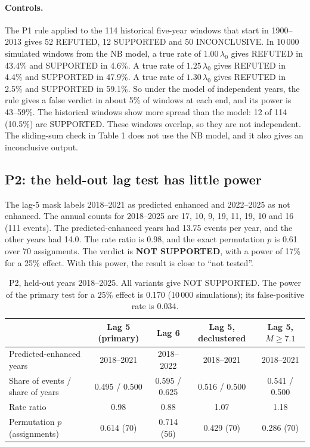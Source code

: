 \documentclass[11pt]{article}
\begin{document}
\paragraph{Controls.} The P1 rule applied to the 114 historical five-year windows that start in 1900--2013 gives 52 REFUTED, 12 SUPPORTED and 50 INCONCLUSIVE. In 10\,000 simulated windows from the NB model, a true rate of $1.00\,\lambda_0$ gives REFUTED in 43.4\% and SUPPORTED in 4.6\%. A true rate of $1.25\,\lambda_0$ gives REFUTED in 4.4\% and SUPPORTED in 47.9\%. A true rate of $1.30\,\lambda_0$ gives REFUTED in 2.5\% and SUPPORTED in 59.1\%. So under the model of independent years, the rule gives a false verdict in about 5\% of windows at each end, and its power is 43--59\%. The historical windows show more spread than the model: 12 of 114 (10.5\%) are SUPPORTED. These windows overlap, so they are not independent. The sliding-sum check in Table 1 does not use the NB model, and it also gives an inconclusive output.

\subsection{P2: the held-out lag test has little power}
The lag-5 mask labels 2018--2021 as predicted enhanced and 2022--2025 as not enhanced. The annual counts for 2018--2025 are 17, 10, 9, 19, 11, 19, 10 and 16 (111 events). The predicted-enhanced years had 13.75 events per year, and the other years had 14.0. The rate ratio is 0.98, and the exact permutation $p$ is 0.61 over 70 assignments. The verdict is \textbf{NOT SUPPORTED}, with a power of 17\% for a 25\% effect. With this power, the result is close to ``not tested''.

\begin{table}[t]
\centering\footnotesize
\begin{tabular}{lcccc}
\toprule
 & Lag 5 (primary) & Lag 6 & Lag 5, declustered & Lag 5, $M\ge7.1$\\
\midrule
Predicted-enhanced years & 2018--2021 & 2018--2022 & 2018--2021 & 2018--2021\\
Share of events / share of years & 0.495 / 0.500 & 0.595 / 0.625 & 0.516 / 0.500 & 0.541 / 0.500\\
Rate ratio & 0.98 & 0.88 & 1.07 & 1.18\\
Permutation $p$ (assignments) & 0.614 (70) & 0.714 (56) & 0.429 (70) & 0.286 (70)\\
\bottomrule
\end{tabular}
\caption{P2, held-out years 2018--2025. All variants give NOT SUPPORTED. The power of the primary test for a 25\% effect is 0.170 (10\,000 simulations); its false-positive rate is 0.034.}
\end{table}
\end{document}
